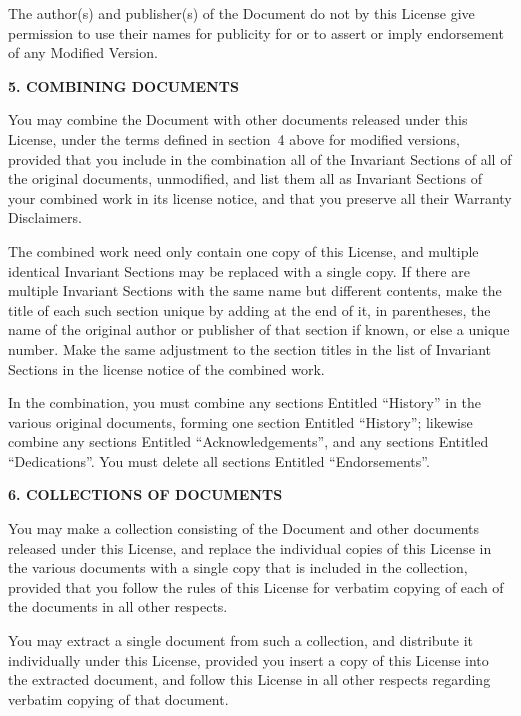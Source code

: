 The author(s) and publisher(s) of the Document do not by this License
give permission to use their names for publicity for or to assert or
imply endorsement of any Modified Version.


\begin{center}
{\Large\bf 5. COMBINING DOCUMENTS\par}
\end{center}


You may combine the Document with other documents released under this
License, under the terms defined in section~4 above for modified
versions, provided that you include in the combination all of the
Invariant Sections of all of the original documents, unmodified, and
list them all as Invariant Sections of your combined work in its
license notice, and that you preserve all their Warranty Disclaimers.

The combined work need only contain one copy of this License, and
multiple identical Invariant Sections may be replaced with a single
copy.  If there are multiple Invariant Sections with the same name but
different contents, make the title of each such section unique by
adding at the end of it, in parentheses, the name of the original
author or publisher of that section if known, or else a unique number.
Make the same adjustment to the section titles in the list of
Invariant Sections in the license notice of the combined work.

In the combination, you must combine any sections Entitled ``History''
in the various original documents, forming one section Entitled
``History''; likewise combine any sections Entitled ``Acknowledgements'',
and any sections Entitled ``Dedications''.  You must delete all sections
Entitled ``Endorsements''.

\begin{center}
{\Large\bf 6. COLLECTIONS OF DOCUMENTS\par}
\end{center}

You may make a collection consisting of the Document and other documents
released under this License, and replace the individual copies of this
License in the various documents with a single copy that is included in
the collection, provided that you follow the rules of this License for
verbatim copying of each of the documents in all other respects.

You may extract a single document from such a collection, and distribute
it individually under this License, provided you insert a copy of this
License into the extracted document, and follow this License in all
other respects regarding verbatim copying of that document.


